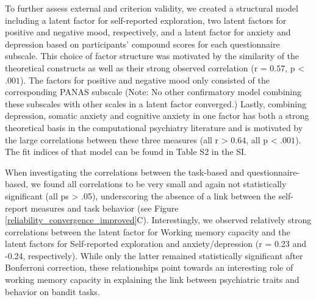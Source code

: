 \documentclass[fleqn,10pt]{wlscirep}
\begin{document}
To further assess external and criterion validity, we created a structural model including a latent factor for self-reported exploration, two latent factors for positive and negative mood, respectively, and a latent factor for anxiety and depression based on participants' compound scores for each questionnaire subscale. This choice of factor structure was motivated by the similarity of the theoretical constructs as well as their strong observed correlation (r = $0.57$, p < $.001$). The factors for positive and negative mood only consisted of the corresponding PANAS subscale (Note: No other confirmatory model combining these subscales with other scales in a latent factor converged.) Lastly, combining depression, somatic anxiety and cognitive anxiety in one factor has both a strong theoretical basis in the computational psychiatry literature \cite{wise2023identifying, gillan2016characterizing} and is motivated by the large correlations between these three measures (all r > $0.64$, all p < $.001$). The fit indices of that model can be found in Table S2 in the SI.

When investigating the correlations between the task-based and questionnaire-based, we found all correlations to be very small and again not statistically significant (all ps > .05), underscoring the absence of a link between the self-report measures and task behavior (see Figure \ref{reliability_convergence_improved}C). Interestingly, we observed relatively strong correlations between the latent factor for Working memory capacity and the latent factors for Self-reported exploration and anxiety/depression (r = 0.23 and -0.24, respectively). While only the latter remained statistically significant after Bonferroni correction, these relationships point towards an interesting role of working memory capacity in explaining the link between psychiatric traits and behavior on bandit tasks.




\end{document}
